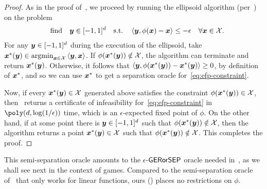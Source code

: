 \begin{proof}
As in the proof of~, we proceed by running the ellipsoid algorithm (per~) on the problem
\begin{align}
    \qq{find} \vy\in [-1,1]^d \qq{s.t.} \ip{\vy, \phi(\vx) - \vx} \le -\eps \quad \forall \vx \in \cX. \label{eq:efp-constraint}
\end{align}
For any ${\bm{y}} \in [-1, 1]^d$ during the execution of the ellipsoid, take $\vx^*(\vy) \in \argmin_{\vx \in \cX} \ip{\vy, \vx}$. If $\phi({\bm{x}}^*({\bm{y}})) \notin {\mathcal{X}}$, the algorithm can terminate and return ${\bm{x}}^*({\bm{y}})$. Otherwise, it follows that $\langle {\bm{y}}, \phi({\bm{x}}^*({\bm{y}})) - {\bm{x}}^*({\bm{y}}) \rangle \geq 0$, by definition of ${\bm{x}}^*$, and so we can use ${\bm{x}}^*$ to get a separation oracle for~\eqref{eq:efp-constraint}.

Now, if every ${\bm{x}}^*({\bm{y}}) \in {\mathcal{X}}$ generated above satisfies the constraint $\phi({\bm{x}}^*({\bm{y}})) \in {\mathcal{X}}$, then~ returns a certificate of infeasibility for~\eqref{eq:efp-constraint} in $\poly(d, \log(1/\epsilon))$ time, which is an $\epsilon$-expected fixed point of $\phi$. On the other hand, if at some point there is ${\bm{y}} \in [-1, 1]^d$ such that $\phi({\bm{x}}^*({\bm{y}})) \notin {\mathcal{X}}$, then the algorithm returns a point ${\bm{x}}^*({\bm{y}}) \in {\mathcal{X}}$ such that $\phi({\bm{x}}^*({\bm{y}})) \notin {\mathcal{X}}$. This completes the proof.
\end{proof}

This semi-separation oracle amounts to the $\epsilon$-$\textsf{GERorSEP}$ oracle needed in~, as we shall see next in the context of games. Compared to the semi-separation oracle of~\citet{Daskalakis24:Efficient} that only works for linear functions, ours () places no restrictions on $\phi$. 
